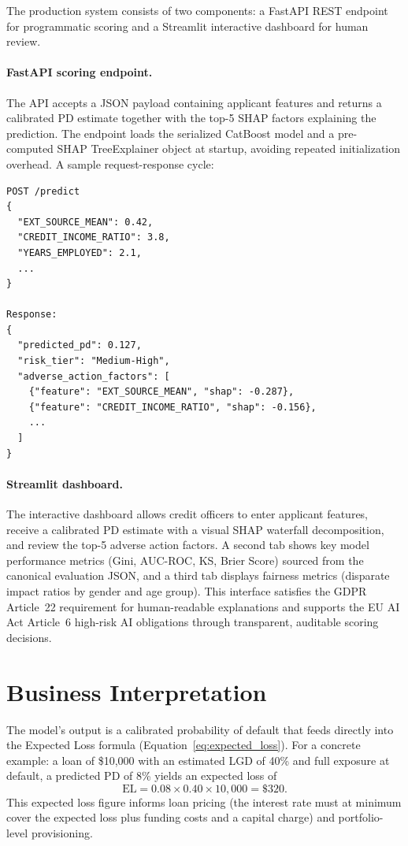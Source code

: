 \documentclass[11pt, a4paper]{article}
\newcommand{\EL}{\text{EL}}
\begin{document}
The production system consists of two components: a FastAPI REST endpoint for programmatic scoring and a Streamlit interactive dashboard for human review.

\paragraph{FastAPI scoring endpoint.} The API accepts a JSON payload containing applicant features and returns a calibrated PD estimate together with the top-5 SHAP factors explaining the prediction. The endpoint loads the serialized CatBoost model and a pre-computed SHAP TreeExplainer object at startup, avoiding repeated initialization overhead. A sample request-response cycle:

\begin{lstlisting}
POST /predict
{
  "EXT_SOURCE_MEAN": 0.42,
  "CREDIT_INCOME_RATIO": 3.8,
  "YEARS_EMPLOYED": 2.1,
  ...
}

Response:
{
  "predicted_pd": 0.127,
  "risk_tier": "Medium-High",
  "adverse_action_factors": [
    {"feature": "EXT_SOURCE_MEAN", "shap": -0.287},
    {"feature": "CREDIT_INCOME_RATIO", "shap": -0.156},
    ...
  ]
}
\end{lstlisting}

\paragraph{Streamlit dashboard.} The interactive dashboard allows credit officers to enter applicant features, receive a calibrated PD estimate with a visual SHAP waterfall decomposition, and review the top-5 adverse action factors. A second tab shows key model performance metrics (Gini, AUC-ROC, KS, Brier Score) sourced from the canonical evaluation JSON, and a third tab displays fairness metrics (disparate impact ratios by gender and age group). This interface satisfies the GDPR Article~22 requirement for human-readable explanations and supports the EU AI Act Article~6 high-risk AI obligations through transparent, auditable scoring decisions.

\section{Business Interpretation}
\label{sec:business}

The model's output is a calibrated probability of default that feeds directly into the Expected Loss formula (Equation~\ref{eq:expected_loss}). For a concrete example: a loan of \$10,000 with an estimated LGD of 40\% and full exposure at default, a predicted PD of 8\% yields an expected loss of
\[
\EL = 0.08 \times 0.40 \times 10{,}000 = \$320.
\]
This expected loss figure informs loan pricing (the interest rate must at minimum cover the expected loss plus funding costs and a capital charge) and portfolio-level provisioning.
\end{document}
